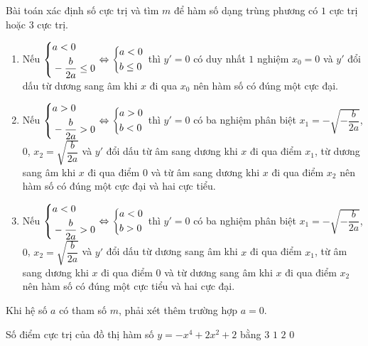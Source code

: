 \begin{dang}{Bài toán xác định số cực trị và tìm $m$ để hàm số dạng trùng phương có $1$ cực trị hoặc $3$ cực trị.}
\begin{enumerate}[$\bullet$]
\begin{enumerate}
			\item Nếu $\left\{\begin{aligned}&a<0\\&-\dfrac{b}{2a}\le 0\end{aligned}\right.\Leftrightarrow \left\{\begin{aligned}& a<0\\ &b \le 0\end{aligned}\right.$ thì $y'=0$ có duy nhất $1$ nghiệm $x_0=0$ và $y'$ đổi dấu từ dương sang âm khi $x$ đi qua $x_0$ nên hàm số có đúng một cực đại.
			\item Nếu $\left\{\begin{aligned}&a>0\\&-\dfrac{b}{2a}> 0\end{aligned}\right.\Leftrightarrow \left\{\begin{aligned}& a>0\\ &b<0\end{aligned}\right.$ thì $y'=0$ có ba nghiệm phân biệt $x_1=-\sqrt{-\dfrac{b}{2a}}$, $0$, $x_2=\sqrt{\dfrac{b}{2a}}$ và $y'$ đổi dấu từ âm sang dương khi $x$ đi qua điểm $x_1$, từ dương sang âm khi $x$ đi qua điểm $0$ và từ âm sang dương khi $x$ đi qua điểm $x_2$ nên hàm số có đúng một cực đại và hai cực tiểu.
			\item Nếu $\left\{\begin{aligned}&a<0\\&-\dfrac{b}{2a}> 0\end{aligned}\right.\Leftrightarrow \left\{\begin{aligned}& a<0\\ &b>0\end{aligned}\right.$ thì $y'=0$ có ba nghiệm phân biệt $x_1=-\sqrt{-\dfrac{b}{2a}}$, $0$, $x_2=\sqrt{\dfrac{b}{2a}}$ và $y'$ đổi dấu từ dương sang âm khi $x$ đi qua điểm $x_1$, từ âm sang dương khi $x$ đi qua điểm $0$ và từ dương sang âm khi $x$ đi qua điểm $x_2$ nên hàm số có đúng một cực tiểu và hai cực đại.
		\end{enumerate}
	\end{enumerate}
\end{dang}

\begin{note}
	Khi hệ số $ a $ có tham số $ m $, phải xét thêm trường hợp $ a=0 $.
\end{note}

\begin{vd}%
	Số điểm cực trị của đồ thị hàm số $y=-x^4+2x^2+2$ bằng
	\choice
	{\True $3$}
	{$1$}
	{$2$}
	{$0$}
\end{vd}

